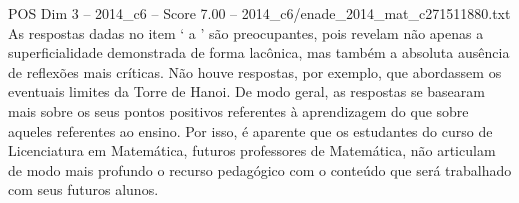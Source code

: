 \begin{textsample}{POS Dim 3 – 2014\_c6 – Score 7.00 – 2014\_c6/enade\_2014\_mat\_c271511880.txt}
As respostas dadas no item ‘ a ’ são preocupantes, pois revelam não apenas a superficialidade demonstrada de forma lacônica, mas também a absoluta ausência de reflexões mais críticas.
Não houve respostas, por exemplo, que abordassem os eventuais limites da Torre de Hanoi.
De modo geral, as respostas se basearam mais sobre os seus pontos positivos referentes à aprendizagem do que sobre aqueles referentes ao ensino.
Por isso, é aparente que os estudantes do curso de Licenciatura em Matemática, futuros professores de Matemática, não articulam de modo mais profundo o recurso pedagógico com o conteúdo que será trabalhado com seus futuros alunos.

\end{textsample}
